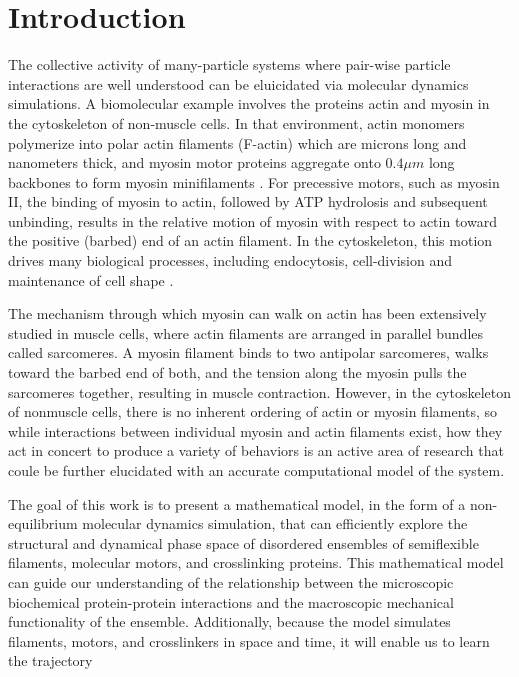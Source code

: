 \documentclass[12pt]{article}
\begin{document}
\section{Introduction} 
The collective activity of many-particle systems where pair-wise particle interactions are well understood 
can be eluicidated via molecular dynamics simulations. 
A biomolecular example involves the proteins actin and myosin in the cytoskeleton of non-muscle cells. In that
environment, actin monomers polymerize into polar actin filaments (F-actin) which are microns long and
nanometers thick, and myosin motor proteins aggregate onto $0.4\mu m$ long backbones to form myosin minifilaments \cite{niederman1975}. 
For precessive motors, such as myosin II, the binding of myosin to actin, followed by ATP hydrolosis and subsequent
unbinding, results in the relative motion of myosin with
respect to actin toward the positive (barbed) end of an actin filament. In the cytoskeleton, this
motion drives many biological processes, including endocytosis, cell-division and maintenance of cell shape
\cite{stricker2010, murrell2012}.
\par
The mechanism through which myosin can walk on actin has been extensively studied in muscle cells, where actin
filaments are arranged in parallel bundles called sarcomeres. A myosin filament binds to two antipolar
sarcomeres, walks toward the barbed end of both, and the tension along the myosin pulls the 
sarcomeres together, resulting in muscle contraction\cite{huxley1969}. 
However, in the cytoskeleton of nonmuscle cells, there is no inherent ordering of actin or myosin filaments, so while
interactions between individual myosin and actin filaments exist, how 
they act in concert to produce a variety of behaviors is an active area of research 
that coule be further elucidated with an accurate computational model of the system\cite{murrell2012, stam2015, murrell2015}. 
\par
The goal of this work is to present a mathematical model, in the form of a non-equilibrium molecular dynamics
simulation, that can efficiently explore the structural and dynamical phase space of 
disordered ensembles of semiflexible filaments, molecular motors, and crosslinking proteins.
This mathematical model can guide our understanding of the relationship between
the microscopic biochemical protein-protein interactions and the macroscopic mechanical functionality of the ensemble. Additionally,
because the model simulates filaments, motors, and crosslinkers in space and time, it will enable us to learn the trajectory
\end{document}
